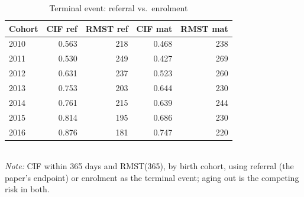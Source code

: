 \begin{table}[htbp]\centering
\caption{Terminal event: referral vs.\ enrolment}
\label{tab:P2end}
\footnotesize
\setlength{\tabcolsep}{4pt}
\begin{tabular}{lrrrr}
\toprule
Cohort & CIF ref & RMST ref & CIF mat & RMST mat \\
\midrule
2010 & 0.563 & 218 & 0.468 & 238 \\
2011 & 0.530 & 249 & 0.427 & 269 \\
2012 & 0.631 & 237 & 0.523 & 260 \\
2013 & 0.753 & 203 & 0.644 & 230 \\
2014 & 0.761 & 215 & 0.639 & 244 \\
2015 & 0.814 & 195 & 0.686 & 230 \\
2016 & 0.876 & 181 & 0.747 & 220 \\
\bottomrule
\end{tabular}
\\[3pt]{\footnotesize \textit{Note:} CIF within 365 days and RMST(365), by birth cohort, using referral (the paper's endpoint) or enrolment as the terminal event; aging out is the competing risk in both.}
\end{table}
